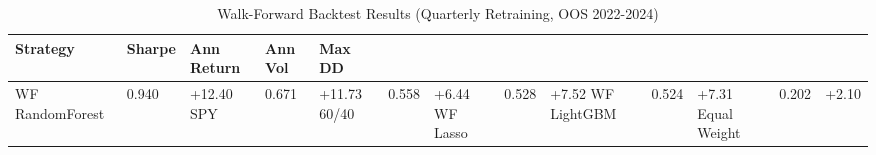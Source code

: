 \begin{table}
\caption{Walk-Forward Backtest Results (Quarterly Retraining, OOS 2022-2024)}
\label{tab:wf_all}
\begin{tabular}{lllll}
\toprule
Strategy & Sharpe & Ann Return & Ann Vol & Max DD \\
\midrule
WF RandomForest & 0.940 & +12.40%
SPY & 0.671 & +11.73%
60/40 & 0.558 & +6.44%
WF Lasso & 0.528 & +7.52%
WF LightGBM & 0.524 & +7.31%
Equal Weight & 0.202 & +2.10%
\bottomrule
\end{tabular}
\end{table}
